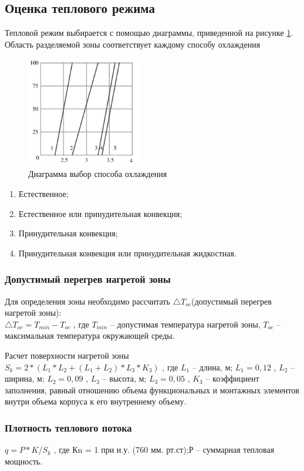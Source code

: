 		\subsection{Оценка теплового режима}
				Тепловой режим выбирается с помощью диаграммы, приведенной на рисунке \ref{projectp1}. Область
			разделяемой зоны соответствует каждому способу охлаждения
			\begin{figure}[ht!]
				\centering
				\includegraphics[width=50mm]{src/pictures/projectp1.png}
				\caption{Диаграмма выбор способа охлаждения}\label{projectp1}
			\end{figure}
			\begin{enumerate}
				\item Естественное;
				\item Естественное или принудительная конвекция;
				\item Принудительная конвекция;
				\item Принудительная конвекция или принудительная жидкостная.
			\end{enumerate}
			\subsubsection{Допустимый перегрев нагретой зоны}
					Для определения зоны необходимо рассчитать $\bigtriangleup T_{oc}$(допустимый перегрев нагретой зоны): \\
				$\bigtriangleup T_{oc} = T_{min} - T_{oc}$
				, где $T_{min}$ – допустимая температура нагретой зоны,
				$T_{oc}$ – максимальная температура окружающей среды.

					Расчет поверхности нагретой зоны \\
				$S_k = 2 * (L_1 * L_2 + (L_1 + L_2) * L_3 * K_3)$
				, где $L_1$ – длина, м; $L_1 = 0,12$
				, $L_2$ – ширина, м; $L_2 = 0,09$
				, $L_3$ – высота, м; $L_3 = 0,05$
				, $K_3$ – коэффициент заполнения, равный отношению объема функциональных и монтажных элементов внутри объема корпуса к его внутреннему объему.
			\subsubsection{Плотность теплового потока}
				$q = {P * K}/{S_k}$
				, где Кn = 1 при н.у. (760 мм. рт.ст);Р – суммарная тепловая мощность.
